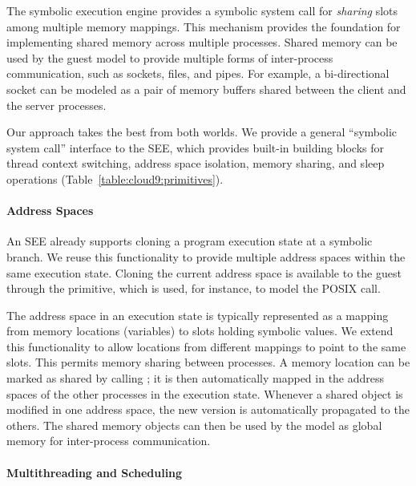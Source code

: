 The symbolic execution engine provides a symbolic system call for \emph{sharing} slots among multiple memory mappings.  This mechanism provides the foundation for implementing shared memory across multiple processes.
%
Shared memory can be used by the guest model to provide multiple forms of inter-process communication, such as sockets, files, and pipes.
%
For example, a bi-directional socket can be modeled as a pair of memory buffers shared between the client and the server processes.



Our approach takes the best from both worlds.
%
We provide a general ``symbolic system call'' interface to the SEE, which provides built-in building blocks for thread context switching, address space isolation, memory sharing, and sleep operations (Table~\ref{table:cloud9:primitives}).


\paragraph{Address Spaces}

An SEE already supports cloning a program execution state at a symbolic branch.
%
We reuse this functionality to provide multiple address spaces within the same execution state.  Cloning the current address space is available to the guest through the  primitive, which is used, for instance, to model the POSIX  call.

The address space in an execution state is typically represented as a mapping from memory locations (variables) to slots holding symbolic values.
%
We extend this functionality to allow locations from different mappings to point to the same slots.  This permits memory sharing between processes.
%
A memory location can be marked as shared by calling ; it is then automatically mapped in the address spaces of the other processes in the execution state.  Whenever a shared object is modified in one address space, the new version is automatically propagated to the others.  The shared memory objects can then be used by the model as global memory for inter-process communication.

\paragraph{Multithreading and Scheduling}

